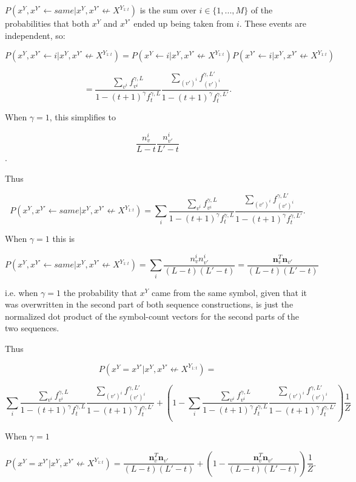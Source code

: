 \documentclass{article}
\begin{document}
$P(x^Y, x^{Y'} \leftarrow same|x^Y, x^{Y'} \not\leftarrow X^{Y_{1:t}})$ is the sum over $i \in \{1, ..., M\}$ of the probabilities that both $x^Y$ and $x^{Y'}$ ended up being taken from $i$. These events are independent, so:

$$P(x^Y, x^{Y'} \leftarrow i|x^Y, x^{Y'} \not\leftarrow X^{Y_{1:t}}) = P(x^Y \leftarrow i|x^Y, x^{Y'} \not\leftarrow X^{Y_{1:t}})P(x^{Y'} \leftarrow i|x^Y, x^{Y'} \not\leftarrow X^{Y_{1:t}})$$

$$ = \frac{\sum\limits_{v^i} f_{v^i}^{\gamma,L}}{1 - (t+1)^\gamma f^{\gamma,L}_t} \frac{\sum\limits_{(v')^i} f^{\gamma,L'}_{(v')^i}}{1 - (t+1)^\gamma f^{\gamma,L'}_t}.$$

When $\gamma = 1$, this simplifies to

$$\frac{n^i_v}{L-t}\frac{n^i_{v'}}{L'-t}$$.

Thus

$$P(x^Y, x^{Y'} \leftarrow same|x^Y, x^{Y'} \not\leftarrow X^{Y_{1:t}}) = \sum_i \frac{\sum\limits_{v^i} f^{\gamma,L}_{v^i}}{1 - (t+1)^\gamma f^{\gamma,L}_t} \frac{\sum\limits_{(v')^i} f^{\gamma,L'}_{(v')^i}}{1 - (t+1)^\gamma f^{\gamma,L'}_t}.$$

When $\gamma = 1$ this is

$$P(x^Y, x^{Y'} \leftarrow same|x^Y, x^{Y'} \not\leftarrow X^{Y_{1:t}}) = \sum_i \frac{n^i_vn^i_{v'}}{(L-t)(L'-t)} = \frac{\mathbf{n}^T_v\mathbf{n}_{v'}}{(L-t)(L'-t)}$$

i.e. when $\gamma = 1$ the probability that $x^Y$ came from the same symbol, given that it was overwritten in the second part of both sequence constructions, is just the normalized dot product of the symbol-count vectors for the second parts of the two sequences.

Thus

$$P(x^Y = x^{Y'}|x^Y, x^{Y'} \not\leftarrow X^{Y_{1:t}}) = $$

$$\sum_i \frac{\sum\limits_{v^i} f^{\gamma,L}_{v^i}}{1 - (t+1)^\gamma f^{\gamma,L}_t} \frac{\sum\limits_{(v')^i} f^{\gamma,L'}_{(v')^i}}{1 - (t+1)^\gamma f^{\gamma,L'}_t} + \left(1 - \sum_i \frac{\sum\limits_{v^i} f^{\gamma,L}_{v^i}}{1 - (t+1)^\gamma f^{\gamma,L}_t} \frac{\sum\limits_{(v')^i} f^{\gamma,L'}_{(v')^i}}{1 - (t+1)^\gamma f^{\gamma,L'}_t}\right)\frac{1}{Z}$$

When $\gamma = 1$

$$P(x^Y = x^{Y'}|x^Y, x^{Y'} \not\leftarrow X^{Y_{1:t}}) = \frac{\mathbf{n}^T_v\mathbf{n}_{v'}}{(L-t)(L'-t)} + \left(1 - \frac{\mathbf{n}^T_v\mathbf{n}_{v'}}{(L-t)(L'-t)} \right)\frac{1}{Z}.$$
\end{document}
